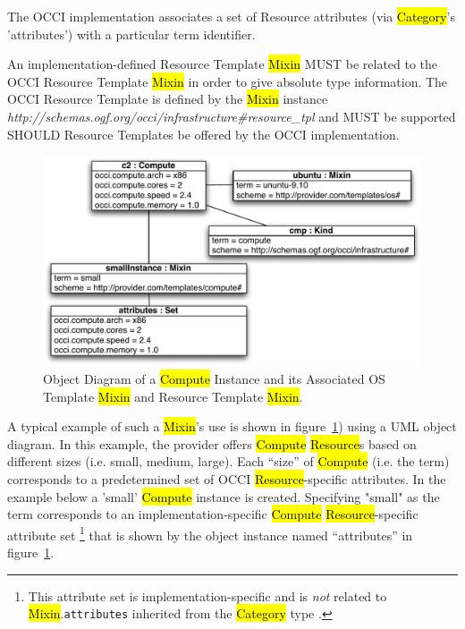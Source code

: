 \documentclass[10pt,a4paper]{article}
\begin{document}
The OCCI implementation associates a set of Resource attributes (via \hl{Category}'s 'attributes') with 
a particular term identifier. 

An implementation-defined Resource Template \hl{Mixin} MUST be related 
to the OCCI Resource Template \hl{Mixin} in order to give absolute type information.
%
The OCCI Resource Template is defined by the \hl{Mixin} instance
\textit{http://schemas.ogf.org/occi/infrastructure\#resource\_tpl} and MUST be 
supported SHOULD Resource Templates be offered by the OCCI implementation.

\begin{figure}[!h]
	\centering
	\includegraphics[scale=0.5]{figs/infra_template_obj_diag2}
	\caption{Object Diagram of a \hl{Compute} Instance and its Associated OS Template 
	\hl{Mixin} and Resource Template \hl{Mixin}.}
	\label{fig:infra_template_obj_diag2}
\end{figure}

A typical example of such a \hl{Mixin}'s use is shown in
figure~\ref{fig:infra_template_obj_diag2}) using a UML object diagram. 
%
In this example, the provider offers \hl{Compute} \hl{Resource}s based on different sizes (i.e. small,
medium, large). Each ``size'' of \hl{Compute} (i.e. the term) corresponds to a predetermined set of OCCI 
\hl{Resource}-specific attributes. In the example below a 'small' \hl{Compute} instance is created. 
Specifying "small" as the term corresponds to an implementation-specific \hl{Compute} 
\hl{Resource}-specific attribute set%
\footnote{This attribute set is implementation-specific and is {\em not} related to
\hl{Mixin}.{\tt attributes} inherited from the \hl{Category} type \cite{occi:core}.}
that is shown by the object instance named ``attributes'' in
figure~\ref{fig:infra_template_obj_diag2}.
\end{document}
